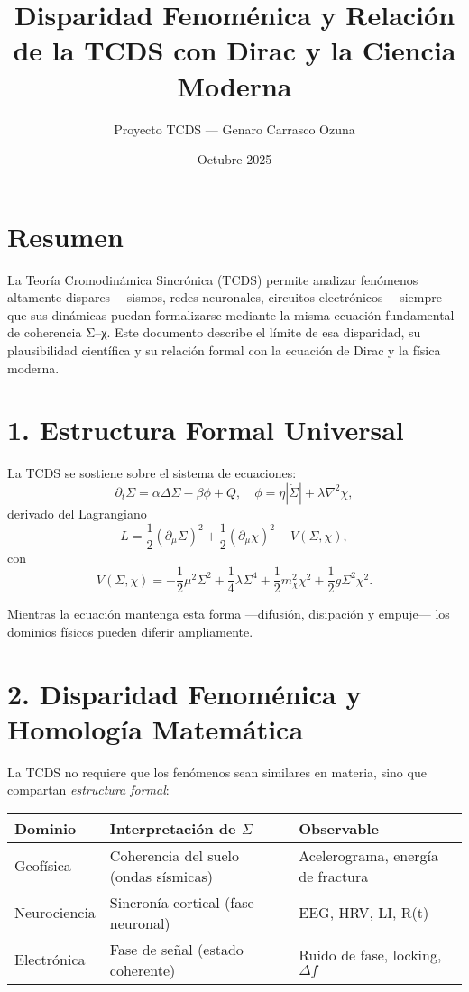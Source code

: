 \documentclass[12pt,a4paper]{article}
\title{\textbf{Disparidad Fenoménica y Relación de la TCDS con Dirac y la Ciencia Moderna}}
\author{Proyecto TCDS — Genaro Carrasco Ozuna}
\date{Octubre 2025}
\begin{document}
\maketitle

\section{Resumen}
La Teoría Cromodinámica Sincrónica (TCDS) permite analizar fenómenos altamente dispares —sismos, redes neuronales, circuitos electrónicos— siempre que sus dinámicas puedan formalizarse mediante la misma ecuación fundamental de coherencia Σ–χ.  
Este documento describe el límite de esa disparidad, su plausibilidad científica y su relación formal con la ecuación de Dirac y la física moderna.

\section{1. Estructura Formal Universal}
La TCDS se sostiene sobre el sistema de ecuaciones:
\[
\partial_t \Sigma = \alpha \Delta \Sigma - \beta \phi + Q,
\quad \phi = \eta |\dot{\Sigma}| + \lambda \nabla^2 \chi,
\]
derivado del Lagrangiano
\[
L = \frac{1}{2}(\partial_\mu \Sigma)^2 + \frac{1}{2}(\partial_\mu \chi)^2 - V(\Sigma,\chi),
\]
con
\[
V(\Sigma,\chi) = -\frac{1}{2}\mu^2\Sigma^2 + \frac{1}{4}\lambda\Sigma^4 + \frac{1}{2}m_\chi^2\chi^2 + \frac{1}{2}g\Sigma^2\chi^2.
\]

Mientras la ecuación mantenga esta forma —difusión, disipación y empuje— los dominios físicos pueden diferir ampliamente.

\section{2. Disparidad Fenoménica y Homología Matemática}
La TCDS no requiere que los fenómenos sean similares en materia, sino que compartan \textit{estructura formal}:
\begin{center}
\begin{tabular}{lll}
\textbf{Dominio} & \textbf{Interpretación de $\Sigma$} & \textbf{Observable}\\
\hline
Geofísica & Coherencia del suelo (ondas sísmicas) & Acelerograma, energía de fractura\\
Neurociencia & Sincronía cortical (fase neuronal) & EEG, HRV, LI, R(t)\\
Electrónica & Fase de señal (estado coherente) & Ruido de fase, locking, $\Delta f$\\
\end{tabular}
\end{center}
\end{document}
